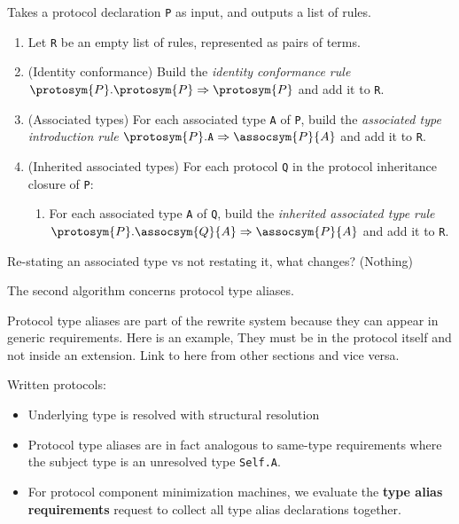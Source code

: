 \documentclass[../generics]{subfiles}
\begin{document}
\begin{algorithm}\label{rules for protocol algo}
Takes a protocol declaration \texttt{P} as input, and outputs a list of rules.
\begin{enumerate}
\item Let \texttt{R} be an empty list of rules, represented as pairs of terms.
%
\item (Identity conformance) Build the \emph{identity conformance rule} $\protosym{P}.\protosym{P}\Rightarrow\protosym{P}$ and add it to \texttt{R}.
%
\item (Associated types) For each associated type \texttt{A} of \texttt{P}, build the \emph{associated type introduction rule} $\protosym{P}.\texttt{A}\Rightarrow\assocsym{P}{A}$ and add it to \texttt{R}.
%
%
\item (Inherited associated types) For each protocol \texttt{Q} in the protocol inheritance closure of \texttt{P}:
\begin{enumerate}
\item For each associated type \texttt{A} of \texttt{Q}, build the \emph{inherited associated type rule} $\protosym{P}.\assocsym{Q}{A}\Rightarrow\assocsym{P}{A}$ and add it to \texttt{R}.
\end{enumerate}
\end{enumerate}
\end{algorithm}

Re-stating an associated type vs not restating it, what changes? (Nothing)

The second algorithm concerns protocol type aliases. 

Protocol type aliases are part of the rewrite system because they can appear in generic requirements. Here is an example, They must be in the protocol itself and not inside an extension. Link to here from other sections and vice versa.

Written protocols:
\begin{itemize}
\item Underlying type is resolved with structural resolution
\item Protocol type aliases are in fact analogous to same-type requirements where the subject type is an unresolved type \texttt{Self.A}.
\item For protocol component minimization machines, we evaluate the \textbf{type alias requirements} request to collect all type alias declarations together.
\end{itemize}
\end{document}
